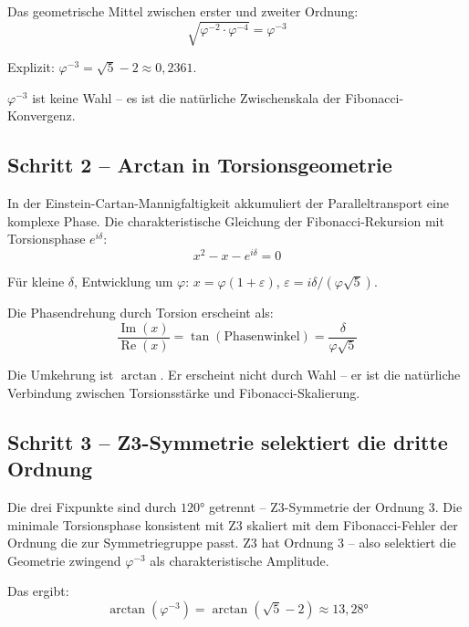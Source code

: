 Das geometrische Mittel zwischen erster und zweiter Ordnung:
\begin{equation}
  \sqrt{\varphi^{-2} \cdot \varphi^{-4}} = \varphi^{-3}
\end{equation}

Explizit: $\varphi^{-3} = \sqrt{5} - 2 \approx 0{,}2361$.

$\varphi^{-3}$ ist keine Wahl -- es ist die natürliche Zwischenskala der Fibonacci-Konvergenz.

\subsection{Schritt 2 -- Arctan in Torsionsgeometrie}

In der Einstein-Cartan-Mannigfaltigkeit akkumuliert der Paralleltransport eine komplexe Phase. Die charakteristische Gleichung der Fibonacci-Rekursion mit Torsionsphase $e^{i\delta}$:
\begin{equation}
  x^2 - x - e^{i\delta} = 0
\end{equation}

Für kleine $\delta$, Entwicklung um $\varphi$: $x = \varphi(1 + \varepsilon)$, $\varepsilon = i\delta/(\varphi\sqrt{5})$.

Die Phasendrehung durch Torsion erscheint als:
\begin{equation}
  \frac{\operatorname{Im}(x)}{\operatorname{Re}(x)} = \tan(\text{Phasenwinkel}) = \frac{\delta}{\varphi\sqrt{5}}
\end{equation}

Die Umkehrung ist $\arctan$. Er erscheint nicht durch Wahl -- er ist die natürliche Verbindung zwischen Torsionsstärke und Fibonacci-Skalierung.

\subsection{Schritt 3 -- Z3-Symmetrie selektiert die dritte Ordnung}

Die drei Fixpunkte sind durch $120°$ getrennt -- Z3-Symmetrie der Ordnung 3. Die minimale Torsionsphase konsistent mit Z3 skaliert mit dem Fibonacci-Fehler der Ordnung die zur Symmetriegruppe passt. Z3 hat Ordnung 3 -- also selektiert die Geometrie zwingend $\varphi^{-3}$ als charakteristische Amplitude.

Das ergibt:
\begin{equation}
  \boxed{\arctan(\varphi^{-3}) = \arctan(\sqrt{5} - 2) \approx 13{,}28°}
\end{equation}

